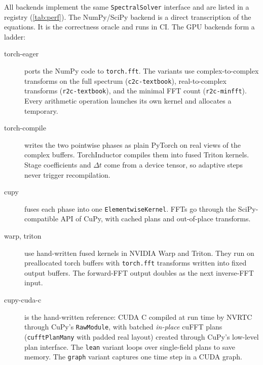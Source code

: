 \documentclass[11pt]{article}
\begin{document}
All backends implement the same \texttt{SpectralSolver} interface and are listed in a registry
(\cref{tab:perf}). The NumPy/SciPy backend is a direct transcription of the equations. It is the
correctness oracle and runs in CI. The GPU backends form a ladder:
\begin{description}
\item[torch-eager] ports the NumPy code to \texttt{torch.fft}. The variants use complex-to-complex
  transforms on the full spectrum (\texttt{c2c-textbook}), real-to-complex transforms
  (\texttt{r2c-textbook}), and the minimal FFT count (\texttt{r2c-minfft}). Every arithmetic
  operation launches its own kernel and allocates a temporary.
\item[torch-compile] writes the two pointwise phases as plain PyTorch on real views of the
  complex buffers. TorchInductor compiles them into fused Triton kernels. Stage coefficients and
  $\Delta t$ come from a device tensor, so adaptive steps never trigger recompilation.
\item[cupy] fuses each phase into one \texttt{ElementwiseKernel}. FFTs go through the
  SciPy-compatible API of CuPy, with cached plans and out-of-place transforms.
\item[warp, triton] use hand-written fused kernels in NVIDIA Warp and Triton. They run on
  preallocated torch buffers with \texttt{torch.fft} transforms written into fixed output
  buffers. The forward-FFT output doubles as the next inverse-FFT input.
\item[cupy-cuda-c] is the hand-written reference: CUDA C compiled at run time by NVRTC through
  CuPy's \texttt{RawModule}, with batched \emph{in-place} cuFFT plans (\texttt{cufftPlanMany}
  with padded real layout) created through CuPy's low-level plan interface. The \texttt{lean}
  variant loops over single-field plans to save memory. The \texttt{graph} variant captures one
  time step in a CUDA graph.
\end{description}
\end{document}
